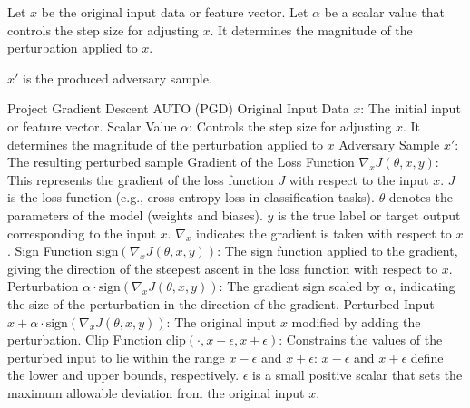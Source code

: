 
Let $x$ be the original input data or feature vector. Let $\alpha$ be a scalar value that controls the step size for adjusting $x$. It determines the magnitude of the perturbation applied to $x$.

$x'$ is the produced adversary sample.



Project Gradient Descent AUTO (PGD) Original Input Data $x$: The initial input or feature vector.
Scalar Value $\alpha$: Controls the step size for adjusting $x$. It determines the magnitude of the perturbation applied to $x$
Adversary Sample $x'$: The resulting perturbed sample
Gradient of the Loss Function $\nabla_x J(\theta, x, y)$: This represents the gradient of the loss function $J$ with respect to the input $x$.
$J$ is the loss function (e.g., cross-entropy loss in classification tasks).
$\theta$ denotes the parameters of the model (weights and biases).
$y$ is the true label or target output corresponding to the input $x$.
$\nabla_x$ indicates the gradient is taken with respect to $x$.
Sign Function $\text{sign}(\nabla_x J(\theta, x, y))$: The sign function applied to the gradient, giving the direction of the steepest ascent in the loss function with respect to $x$.
Perturbation $\alpha \cdot \text{sign}(\nabla_x J(\theta, x, y))$: The gradient sign scaled by $\alpha$, indicating the size of the perturbation in the direction of the gradient.
Perturbed Input $x + \alpha \cdot \text{sign}(\nabla_x J(\theta, x, y))$: The original input $x$ modified by adding the perturbation.
Clip Function $\text{clip}(\cdot, x - \epsilon, x + \epsilon)$: Constrains the values of the perturbed input to lie within the range $x - \epsilon$ and $x + \epsilon$:
$x - \epsilon$ and $x + \epsilon$ define the lower and upper bounds, respectively.
$\epsilon$ is a small positive scalar that sets the maximum allowable deviation from the original input $x$.